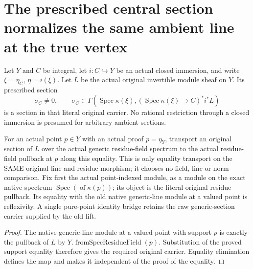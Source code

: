 \section{The prescribed central section normalizes the same ambient line at the true vertex}

Let $Y$ and $C$ be integral, let $i:C\hookrightarrow Y$ be an actual closed
immersion, and write $\xi=\eta_C$, $\eta=i(\xi)$. Let $L$ be the actual
original invertible module sheaf on $Y$. Its prescribed section
\[
 \sigma_C\ne0,\qquad
 \sigma_C\in\Gamma\!\left(\operatorname{Spec}\kappa(\xi),
   (\operatorname{Spec}\kappa(\xi)\to C)^*i^*L\right)
\]
is a section in that literal original carrier. No rational restriction
through a closed immersion is presumed for arbitrary ambient sections.

\begin{definition}
\label{def:gauss-central-line-original-generic-carrier}
\leanok
For an actual point $p\in Y$ with an actual proof $p=\eta_Y$, transport
an original section of $L$ over the actual generic residue-field spectrum
to the actual residue-field pullback at $p$ along this equality. This is
only equality transport on the SAME original line and residue morphism;
it chooses no field, line or norm comparison. Fix first the actual
point-indexed module, as a module on the exact native spectrum
$\operatorname{Spec}(\operatorname{of}\kappa(p))$; its object is the literal
original residue pullback. Its equality with the old native generic-line
module at a valued point is reflexivity. A single pure-point identity
bridge retains the raw generic-section carrier supplied by the old lift.
\end{definition}
\begin{proof}
The native generic-line module at a valued point with support $p$ is
exactly the pullback of $L$ by $Y.\operatorname{fromSpecResidueField}(p)$.
Substitution of the proved support equality therefore gives the required
original carrier. Equality elimination defines the map and makes it
independent of the proof of the equality.
\end{proof}

